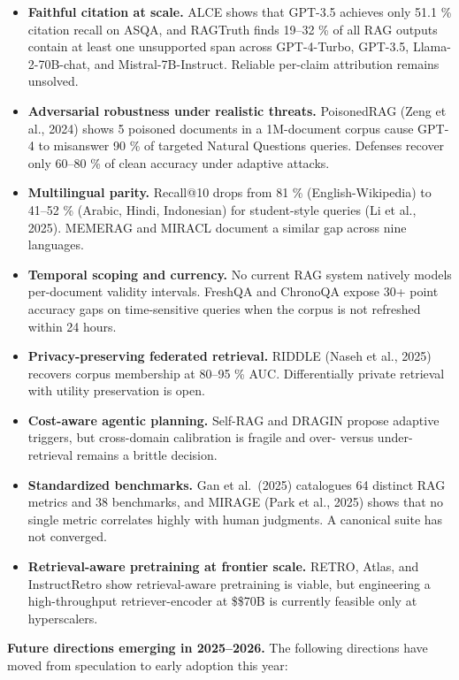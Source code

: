 \begin{itemize}
\tightlist
\item
  \textbf{Faithful citation at scale.} ALCE shows that GPT-3.5 achieves only 51.1 \% citation recall on ASQA, and RAGTruth finds 19--32 \% of all RAG outputs contain at least one unsupported span across GPT-4-Turbo, GPT-3.5, Llama-2-70B-chat, and Mistral-7B-Instruct. Reliable per-claim attribution remains unsolved.
\item
  \textbf{Adversarial robustness under realistic threats.} PoisonedRAG (Zeng et al., 2024) shows 5 poisoned documents in a 1M-document corpus cause GPT-4 to misanswer 90 \% of targeted Natural Questions queries. Defenses recover only 60--80 \% of clean accuracy under adaptive attacks.
\item
  \textbf{Multilingual parity.} Recall@10 drops from 81 \% (English-Wikipedia) to 41--52 \% (Arabic, Hindi, Indonesian) for student-style queries (Li et al., 2025). MEMERAG and MIRACL document a similar gap across nine languages.
\item
  \textbf{Temporal scoping and currency.} No current RAG system natively models per-document validity intervals. FreshQA and ChronoQA expose 30+ point accuracy gaps on time-sensitive queries when the corpus is not refreshed within 24 hours.
\item
  \textbf{Privacy-preserving federated retrieval.} RIDDLE (Naseh et al., 2025) recovers corpus membership at 80--95 \% AUC. Differentially private retrieval with utility preservation is open.
\item
  \textbf{Cost-aware agentic planning.} Self-RAG and DRAGIN propose adaptive triggers, but cross-domain calibration is fragile and over- versus under-retrieval remains a brittle decision.
\item
  \textbf{Standardized benchmarks.} Gan et al.~(2025) catalogues 64 distinct RAG metrics and 38 benchmarks, and MIRAGE (Park et al., 2025) shows that no single metric correlates highly with human judgments. A canonical suite has not converged.
\item
  \textbf{Retrieval-aware pretraining at frontier scale.} RETRO, Atlas, and InstructRetro show retrieval-aware pretraining is viable, but engineering a high-throughput retriever-encoder at \$\geq\$70B is currently feasible only at hyperscalers.
\end{itemize}

\textbf{Future directions emerging in 2025--2026.} The following directions have moved from speculation to early adoption this year:

